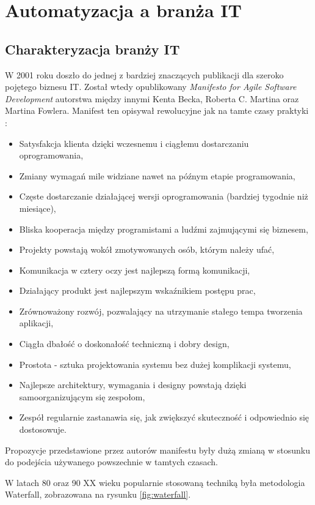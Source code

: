 \section{Automatyzacja a branża IT}
\subsection{Charakteryzacja branży IT}
W 2001 roku doszło do jednej z bardziej znaczących publikacji dla szeroko pojętego biznesu IT. Został wtedy opublikowany \textit{Manifesto for Agile Software Development} autorstwa między innymi Kenta Becka, Roberta C. Martina oraz Martina Fowlera. Manifest ten opisywał rewolucyjne jak na tamte czasy praktyki \cite{AgileManifesto}:
\begin{itemize}
    \item Satysfakcja klienta dzięki wczesnemu i ciągłemu dostarczaniu oprogramowania,
    \item Zmiany wymagań mile widziane nawet na późnym etapie programowania,
    \item Częste dostarczanie działającej wersji oprogramowania (bardziej tygodnie niż miesiące),
    \item Bliska kooperacja między programistami a ludźmi zajmującymi się biznesem,
    \item Projekty powstają wokół zmotywowanych osób, którym należy ufać,
    \item Komunikacja w cztery oczy jest najlepszą formą komunikacji,
    \item Działający produkt jest najlepszym wskaźnikiem postępu prac,
    \item Zrównoważony rozwój, pozwalający na utrzymanie stałego tempa tworzenia aplikacji,
    \item Ciągła dbałość o doskonałość techniczną i dobry design,
    \item Prostota - sztuka projektowania systemu bez dużej komplikacji systemu,
    \item Najlepsze architektury, wymagania i designy powstają dzięki samoorganizującym się zespołom,
    \item Zespół regularnie zastanawia się, jak zwiększyć skuteczność i odpowiednio się dostosowuje.
\end{itemize}
Propozycje przedstawione przez autorów manifestu były dużą zmianą w stosunku do podejścia używanego powszechnie w tamtych czasach.
\par
W latach 80 oraz 90 XX wieku popularnie stosowaną techniką była metodologia Waterfall, zobrazowana na rysunku \ref{fig:waterfall}.
